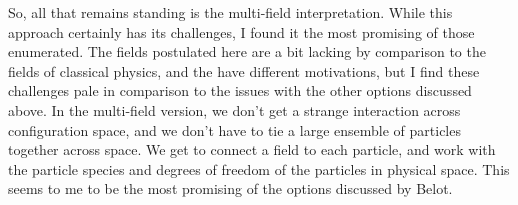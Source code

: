 \documentclass[11pt, a4paper]{article}
\begin{document}
So, all that remains standing is the multi-field interpretation. While this 
approach certainly has its challenges, I found it the most promising of those 
enumerated. The fields postulated here are a bit lacking by comparison to the
fields of classical physics, and the have different motivations, but I find 
these challenges pale in comparison to the issues with the other options 
discussed above. In the multi-field version, we don't get a strange interaction
across configuration space, and we don't have to tie a large ensemble of
particles together across space. We get to connect a field to each particle,
and work with the particle species and degrees of freedom of the particles in 
physical space. This seems to me to be the most promising of the options
discussed by Belot.
\end{document}
